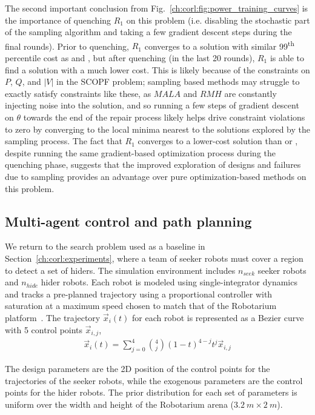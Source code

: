 The second important conclusion from Fig.~\ref{ch:corl:fig:power_training_curves} is the importance of quenching $R_1$ on this problem (i.e. disabling the stochastic part of the sampling algorithm and taking a few gradient descent steps during the final rounds). Prior to quenching, $R_1$ converges to a solution with similar 99\textsuperscript{th} percentile cost as \gdr{} and \gda{}, but after quenching (in the last 20 rounds), $R_1$ is able to find a solution with a much lower cost. This is likely because of the constraints on $P$, $Q$, and $|V|$ in the SCOPF problem; sampling based methods may struggle to exactly satisfy constraints like these, as $MALA$ and $RMH$ are constantly injecting noise into the solution, and so running a few steps of gradient descent on $\theta$ towards the end of the repair process likely helps drive constraint violations to zero by converging to the local minima nearest to the solutions explored by the sampling process. The fact that $R_1$ converges to a lower-cost solution than \gdr{} or \gda{}, despite running the same gradient-based optimization process during the quenching phase, suggests that the improved exploration of designs and failures due to sampling provides an advantage over pure optimization-based methods on this problem.

\subsection{Multi-agent control and path planning}

We return to the search problem used as a baseline in Section~\ref{ch:corl:experiments}, where a team of seeker robots must cover a region to detect a set of hiders. The simulation environment includes $n_{seek}$ seeker robots and $n_{hide}$ hider robots. Each robot is modeled using single-integrator dynamics and tracks a pre-planned trajectory using a proportional controller with saturation at a maximum speed chosen to match that of the Robotarium platform~\cite{wilsonRobotariumGloballyImpactful2020}. The trajectory $\vec{x}_i(t)$ for each robot is represented as a Bezier curve with 5 control points $\vec{x}_{i, j}$,
\begin{align*}
    \vec{x}_i(t) = \sum_{j=0}^4 \binom{4}{j}(1-t)^{4-j}t^j \vec{x}_{i, j}
\end{align*}

The design parameters are the 2D position of the control points for the trajectories of the seeker robots, while the exogenous parameters are the control points for the hider robots. The prior distribution for each set of parameters is uniform over the width and height of the Robotarium arena ($\SI{3.2}{m}\times\SI{2}{m}$).

